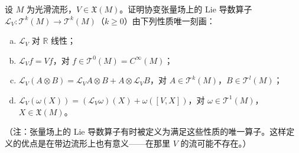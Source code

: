 \documentclass[../../main.tex]{subfiles}
\begin{document}
\begin{exercise}\label{exercise:ch12-12}
设 $M$ 为光滑流形，$V\in\mathfrak X(M)$。证明协变张量场上的 Lie 导数算子 $\mathcal L_V\colon\mathcal T^k(M)\to\mathcal T^k(M)$（$k\geqslant 0$）由下列性质唯一刻画：
\begin{enumerate}[(a)]
\item $\mathcal L_V$ 对 $\mathbb{R}$ 线性；
\item $\mathcal L_V f=Vf$，对 $f\in\mathcal T^0(M)=C^\infty(M)$；
\item $\mathcal L_V(A\otimes B)=\mathcal L_V A\otimes B+A\otimes\mathcal L_V B$，对 $A\in\mathcal T^k(M)$，$B\in\mathcal T^l(M)$；
\item $\mathcal L_V(\omega(X))=(\mathcal L_V\omega)(X)+\omega([V,X])$，对 $\omega\in\mathcal T^1(M)$，$X\in\mathfrak X(M)$。
\end{enumerate}
（注：张量场上的 Lie 导数算子有时被定义为满足这些性质的唯一算子。这样定义的优点是在带边流形上也有意义——在那里 $V$ 的流可能不存在。）
\end{exercise}
\end{document}
